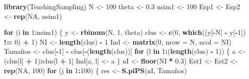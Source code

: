 \documentclass[
  spanish,
  12pt,
]{book}
\newenvironment{Shaded}{\begin{snugshade}}{\end{snugshade}}
\newcommand{\AttributeTok}[1]{\textcolor[rgb]{0.13,0.29,0.53}{#1}}
\newcommand{\ConstantTok}[1]{\textcolor[rgb]{0.56,0.35,0.01}{#1}}
\newcommand{\ControlFlowTok}[1]{\textcolor[rgb]{0.13,0.29,0.53}{\textbf{#1}}}
\newcommand{\DecValTok}[1]{\textcolor[rgb]{0.00,0.00,0.81}{#1}}
\newcommand{\FloatTok}[1]{\textcolor[rgb]{0.00,0.00,0.81}{#1}}
\newcommand{\FunctionTok}[1]{\textcolor[rgb]{0.13,0.29,0.53}{\textbf{#1}}}
\newcommand{\NormalTok}[1]{#1}
\newcommand{\OtherTok}[1]{\textcolor[rgb]{0.56,0.35,0.01}{#1}}
\newcommand{\SpecialCharTok}[1]{\textcolor[rgb]{0.81,0.36,0.00}{\textbf{#1}}}
\begin{document}
\begin{Shaded}
\begin{Highlighting}[]
\FunctionTok{library}\NormalTok{(TeachingSampling)}
\NormalTok{N     }\OtherTok{\textless{}{-}} \DecValTok{100}
\NormalTok{theta }\OtherTok{\textless{}{-}} \FloatTok{0.3}
\NormalTok{nsim1 }\OtherTok{\textless{}{-}} \DecValTok{100}
\NormalTok{Esp1 }\OtherTok{\textless{}{-}}\NormalTok{ Esp2 }\OtherTok{\textless{}{-}} \FunctionTok{rep}\NormalTok{(}\ConstantTok{NA}\NormalTok{, nsim1)}

\ControlFlowTok{for}\NormalTok{ (i }\ControlFlowTok{in} \DecValTok{1}\SpecialCharTok{:}\NormalTok{nsim1) \{}
\NormalTok{  y       }\OtherTok{\textless{}{-}} \FunctionTok{rbinom}\NormalTok{(N, }\DecValTok{1}\NormalTok{, theta)}
\NormalTok{  clus    }\OtherTok{\textless{}{-}} \FunctionTok{c}\NormalTok{(}\DecValTok{0}\NormalTok{, }\FunctionTok{which}\NormalTok{((y[}\SpecialCharTok{{-}}\NormalTok{N] }\SpecialCharTok{{-}}\NormalTok{ y[}\SpecialCharTok{{-}}\DecValTok{1}\NormalTok{]) }\SpecialCharTok{!=} \DecValTok{0}\NormalTok{) }\SpecialCharTok{+} \DecValTok{1}\NormalTok{)}
\NormalTok{  NI      }\OtherTok{\textless{}{-}} \FunctionTok{length}\NormalTok{(clus) }\SpecialCharTok{{-}} \DecValTok{1}
\NormalTok{  Ind     }\OtherTok{\textless{}{-}} \FunctionTok{matrix}\NormalTok{(}\DecValTok{0}\NormalTok{, }\AttributeTok{nrow =}\NormalTok{ N, }\AttributeTok{ncol =}\NormalTok{ NI)}
\NormalTok{  Tamaños }\OtherTok{\textless{}{-}}\NormalTok{ clus[}\SpecialCharTok{{-}}\DecValTok{1}\NormalTok{] }\SpecialCharTok{{-}}\NormalTok{ clus[}\SpecialCharTok{{-}}\NormalTok{(}\FunctionTok{length}\NormalTok{(clus))]}
  \ControlFlowTok{for}\NormalTok{ (l }\ControlFlowTok{in} \DecValTok{1}\SpecialCharTok{:}\NormalTok{(}\FunctionTok{length}\NormalTok{(clus) }\SpecialCharTok{{-}} \DecValTok{1}\NormalTok{)) \{}
\NormalTok{    a }\OtherTok{\textless{}{-}}\NormalTok{ (clus[l] }\SpecialCharTok{+} \DecValTok{1}\NormalTok{)}\SpecialCharTok{:}\NormalTok{clus[l }\SpecialCharTok{+} \DecValTok{1}\NormalTok{]}
\NormalTok{    Ind[a, l] }\OtherTok{\textless{}{-}}\NormalTok{ a}
\NormalTok{  \}}
\NormalTok{  nI      }\OtherTok{\textless{}{-}} \FunctionTok{floor}\NormalTok{(NI }\SpecialCharTok{*} \FloatTok{0.3}\NormalTok{)}
\NormalTok{  Est1 }\OtherTok{\textless{}{-}}\NormalTok{ Est2 }\OtherTok{\textless{}{-}} \FunctionTok{rep}\NormalTok{(}\ConstantTok{NA}\NormalTok{, }\DecValTok{100}\NormalTok{)}
  \ControlFlowTok{for}\NormalTok{ (j }\ControlFlowTok{in} \DecValTok{1}\SpecialCharTok{:}\DecValTok{100}\NormalTok{) \{}
\NormalTok{    res         }\OtherTok{\textless{}{-}} \FunctionTok{S.piPS}\NormalTok{(nI, Tamaños)}

\end{Highlighting}
\end{Shaded}
\end{document}
